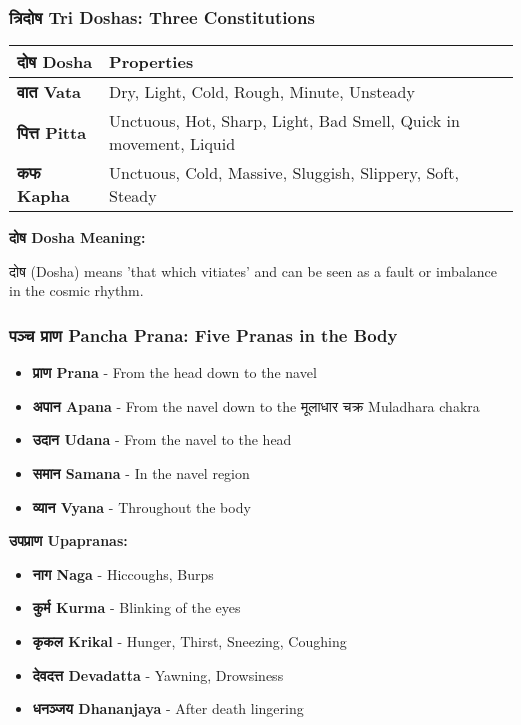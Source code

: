 \begin{frame}[fragile]\frametitle{त्रिदोष  Tri Doshas: Three Constitutions}
    \begin{tabular}{|l|l|}
    \hline
    \textbf{दोष Dosha} & \textbf{Properties} \\
    \hline
    \textbf{वात  Vata} & Dry, Light, Cold, Rough, Minute, Unsteady \\
    \hline
    \textbf{पित्त Pitta} & Unctuous, Hot, Sharp, Light, Bad Smell, Quick in movement, Liquid \\
    \hline
    \textbf{कफ  Kapha} & Unctuous, Cold, Massive, Sluggish, Slippery, Soft, Steady \\
    \hline
    \end{tabular}
    \vspace{0.5cm}
    \textbf{दोष Dosha Meaning:}
    
    दोष (Dosha) means 'that which vitiates' and can be seen as a fault or imbalance in the cosmic rhythm.
    
\end{frame}

\begin{frame}[fragile]\frametitle{पञ्च  प्राण  Pancha Prana: Five Pranas in the Body}
    \begin{itemize}
        \item \textbf{प्राण Prana } - From the head down to the navel
        \item \textbf{अपान Apana} - From the navel down to the मूलाधार  चक्र  Muladhara chakra
        \item \textbf{उदान Udana} - From the navel to the head
        \item \textbf{समान Samana} - In the navel region
        \item \textbf{व्यान Vyana} - Throughout the body
    \end{itemize}
    \vspace{0.5cm}
    \textbf{उपप्राण Upapranas:}
    \begin{itemize}
        \item \textbf{नाग  Naga} - Hiccoughs, Burps
        \item \textbf{कुर्म  Kurma} - Blinking of the eyes
        \item \textbf{कृकल Krikal} - Hunger, Thirst, Sneezing, Coughing
        \item \textbf{देवदत्त Devadatta} - Yawning, Drowsiness
        \item \textbf{धनञ्जय Dhananjaya} - After death lingering
    \end{itemize}
\end{frame}

